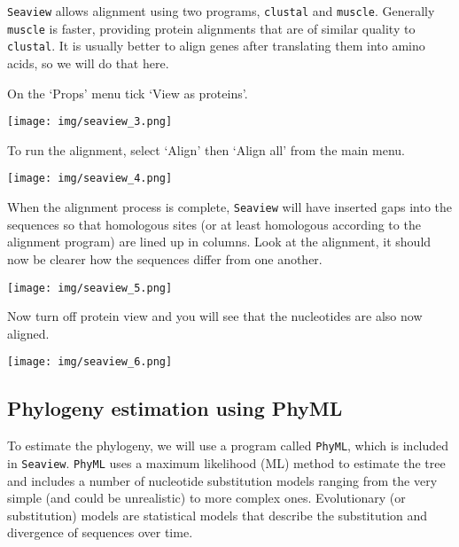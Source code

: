 \documentclass[11pt]{article}
\begin{document}
\texttt{Seaview} allows alignment using two programs, \texttt{clustal}
and \texttt{muscle}. Generally \texttt{muscle} is faster, providing
protein alignments that are of similar quality to \texttt{clustal}. It
is usually better to align genes after translating them into amino
acids, so we will do that here.

    On the `Props' menu tick `View as proteins'.


\begin{center}
\texttt{[image: img/seaview\_3.png]}
\end{center}


    To run the alignment, select `Align' then `Align all' from the main
menu.


\begin{center}
\texttt{[image: img/seaview\_4.png]}
\end{center}


When the alignment process is complete, \texttt{Seaview} will have
inserted gaps into the sequences so that homologous sites (or at least
homologous according to the alignment program) are lined up in columns.
Look at the alignment, it should now be clearer how the sequences differ
from one another.


\begin{center}
\texttt{[image: img/seaview\_5.png]}
\end{center}


    Now turn off protein view and you will see that the nucleotides are also
now aligned.


\begin{center}
\texttt{[image: img/seaview\_6.png]}
\end{center}


    \hypertarget{phylogeny-estimation-using-phyml}{%
\subsection{Phylogeny estimation using
PhyML}\label{phylogeny-estimation-using-phyml}}

To estimate the phylogeny, we will use a program called \texttt{PhyML},
which is included in \texttt{Seaview}. \texttt{PhyML} uses a maximum
likelihood (ML) method to estimate the tree and includes a number of
nucleotide substitution models ranging from the very simple (and could
be unrealistic) to more complex ones. Evolutionary (or substitution)
models are statistical models that describe the substitution and
divergence of sequences over time.
\end{document}
